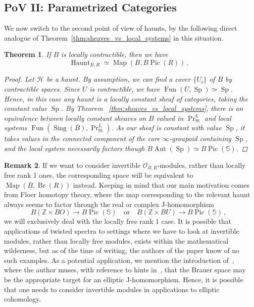 \documentclass[10pt]{amsart}
\newcommand{\longto}{\longrightarrow}
\theoremstyle{plain}
\newtheorem{theorem}{Theorem}[subsection]
\theoremstyle{definition}
\newtheorem{rmk}[theorem]{Remark}
\DeclareMathOperator{\Aut}{Aut}
\DeclareMathOperator{\Sing}{Sing}
\DeclareMathOperator{\Sp}{Sp}
\DeclareMathOperator{\Fun}{Fun}
\DeclareMathOperator{\Pic}{Pic}
\DeclareMathOperator{\Br}{Br}
\DeclareMathOperator{\Haunt}{Haunt}
\DeclareMathOperator{\Map}{Map}
\newcommand{\St}{\mathrm{St}}
\newcommand{\bS}{\mathbb{S}}
\newcommand{\bZ}{\mathbb{Z}}
\newcommand{\cO}{\mathcal{O}}
\begin{document}
\subsection{PoV II: Parametrized Categories}

We now switch to the second point of view of haunts, by the following direct analogue of Theorem~\ref{thm:sheaves_vs_local_systems} in this situation.

\begin{theorem} \label{thm:Haunt_equiv_Map_to_BPicS}
  If $B$ is locally contractible, then we have
  \[
  \Haunt_{B,R} \simeq \Map(B,B\Pic(R)) \,.
  \]
  \begin{proof}
    Let $\mathcal{H}$ be a haunt.
    By assumption, we can find a cover $\{U_i\}$ of $B$ by contractible spaces.
    Since $U$ is contractible, we have $\Fun(U,\Sp) \simeq \Sp$.
    Hence, in this case any haunt is a locally constant sheaf of categories, taking the constant value $\Sp$.
    By Theorem ~\ref{thm:sheaves_vs_local_systems}, there is an equivalence between locally constant sheaves on $B$ valued in $\Pr^L_{\St}$ and local systems $\Fun(\Sing(B),\Pr^L_{\St})$.
    As our sheaf is constant with value $\Sp$, it takes values in the connected component of the core $\infty$-groupoid containing $\Sp$, and the local system necessarily factors though $B\Aut(\Sp) \simeq B\Pic(\bS)$.
  \end{proof}
\end{theorem}

\begin{rmk}
  If we want to consider invertible $\cO_{B,R}$-modules, rather than locally free rank 1 ones, the corresponding space will be equivalent to $\Map(B,\Br(R))$ instead.
  Keeping in mind that our main motivation comes from Floer homotopy theory, where the map corresponding to the relevant haunt always seems to factor through the real or complex J-homomorphism
  \[
  B(\bZ \times BO) \longto B\Pic(\bS) \quad \text{or} \quad B(\bZ \times BU) \longto B\Pic(\bS) \,,
  \]
  we will exclusively deal with the locally free rank $1$ case.
  It is possible that applications of twisted spectra to settings where we have to look at invertible modules, rather than locally free modules, exists within the mathematical wilderness, but as of the time of writing, the authors of the paper know of no such examples.
  As a potential application, we mention the introduction of~\cite{Szy17}, where the author muses, with reference to hints in~\cite{Cla12}, that the Brauer space may be the appropriate target for an elliptic J-homomorphism.
  Hence, it is possible that one needs to consider invertible modules in applications to elliptic cohomology.
\end{rmk}
\end{document}
